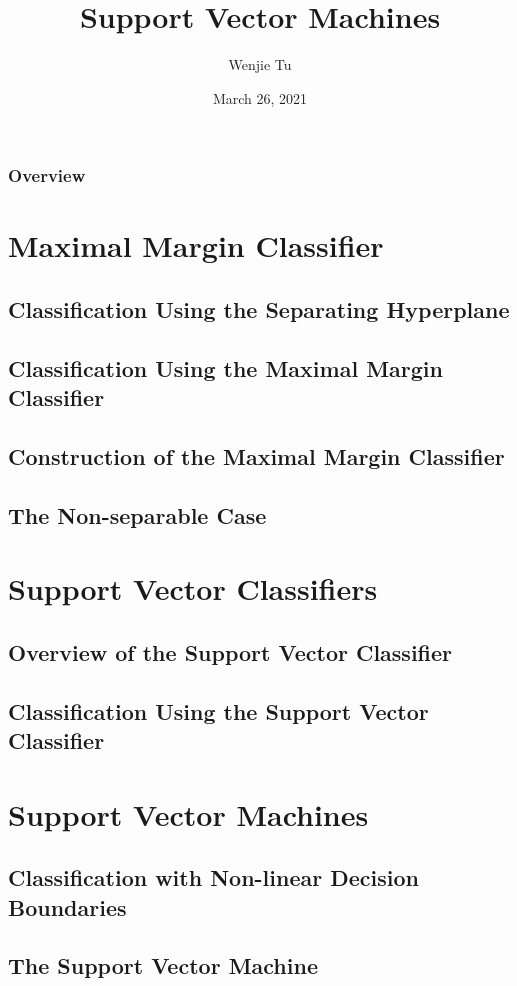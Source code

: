 \documentclass{beamer}
\title[Big Data Methods for Economists]{Support Vector Machines}
\author{
    Wenjie Tu \\
}
\institute[UZH]{
    University of Zurich \\
    \medskip
    \textit{\href{wenjie.tu@uzh.ch}{wenjie.tu@uzh.ch}} \\
}
\date{March 26, 2021}
\begin{document}
\begin{frame}
\titlepage 
\end{frame}

\begin{frame}
    \frametitle{Overview}
    \tableofcontents
\end{frame}
    
\section{Maximal Margin Classifier}
\subsection{Classification Using the Separating Hyperplane}
\subsection{Classification Using the Maximal Margin Classifier}
\subsection{Construction of the Maximal Margin Classifier}
\subsection{The Non-separable Case}

\section{Support Vector Classifiers}
\subsection{Overview of the Support Vector Classifier}
\subsection{Classification Using the Support Vector Classifier}

\section{Support Vector Machines}
\subsection{Classification with Non-linear Decision Boundaries}
\subsection{The Support Vector Machine}
\end{document}
